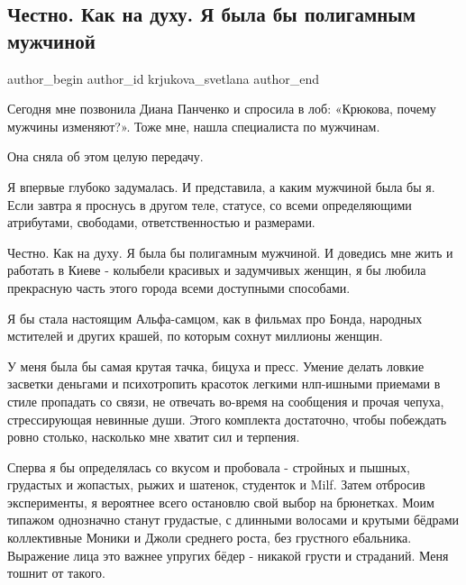  
 
 
 
 
 
\subsection{Честно. Как на духу. Я была бы полигамным мужчиной}
\label{sec:27_10_2021.fb.krjukova_svetlana.1.muzhchina_poligamia}
 
\ifcmt
 author_begin
   author_id krjukova_svetlana
 author_end
\fi

Сегодня мне позвонила Диана Панченко и спросила в лоб: «Крюкова, почему мужчины
изменяют?». Тоже мне, нашла специалиста по мужчинам. 

Она сняла об этом целую передачу.

Я впервые глубоко задумалась. И представила, а каким мужчиной была бы я. Если
завтра я проснусь в другом теле, статусе, со всеми определяющими атрибутами,
свободами, ответственностью и размерами. 

Честно. Как на духу. Я была бы полигамным мужчиной. И доведись мне жить и
работать в Киеве - колыбели красивых и задумчивых женщин, я бы любила
прекрасную часть этого города всеми доступными способами. 

Я бы стала настоящим Альфа-самцом, как в фильмах про Бонда, народных мстителей
и других крашей, по которым сохнут миллионы женщин. 

У меня была бы самая крутая тачка, бицуха и пресс. Умение делать ловкие
засветки деньгами и психотропить красоток легкими нлп-ишными приемами в стиле
пропадать со связи, не отвечать во-время на сообщения и прочая чепуха,
стрессирующая невинные души. Этого комплекта достаточно, чтобы побеждать ровно
столько, насколько мне хватит сил и терпения. 

Сперва я бы определялась со вкусом и пробовала - стройных и пышных, грудастых и
жопастых, рыжих и шатенок, студенток и Milf. Затем отбросив эксперименты, я
вероятнее всего остановлю свой выбор на брюнетках. Моим типажом однозначно
станут грудастые, с длинными волосами и крутыми бёдрами коллективные Моники и
Джоли среднего роста, без грустного ебальника. Выражение лица это важнее
упругих бёдер - никакой грусти и страданий. Меня тошнит от такого.


